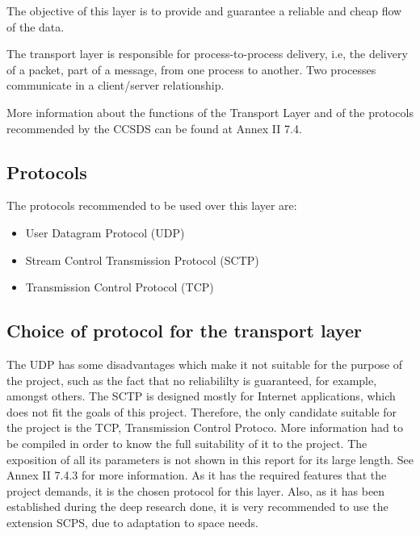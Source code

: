 %
%
%
%
%



The objective of this layer is to provide and guarantee a reliable and cheap flow of the data. 

The transport layer is responsible for process-to-process delivery, i.e, the delivery of a packet, part of a message, from one process to another. Two processes communicate in a client/server relationship. 

More information about the functions of the Transport Layer and of the protocols recommended by the CCSDS can be found at Annex II 7.4.
\subsection{Protocols}
The protocols recommended to be used over this layer are:
\begin{itemize}
\item User Datagram Protocol (UDP)
\item Stream Control Transmission Protocol (SCTP)
\item Transmission Control Protocol (TCP)
\end{itemize}
\subsection{Choice of protocol for the transport layer}
The UDP has some disadvantages which make it not suitable for the purpose of the project, such as the fact that no reliabililty is guaranteed, for example, amongst others. The SCTP is designed mostly for Internet applications, which does not fit the goals of this project. Therefore, the only candidate suitable for the project is the TCP, Transmission Control Protoco. More information had to be compiled in order to know the full suitability of it to the project. The exposition of all its parameters is not shown in this report for its large length. See Annex II 7.4.3 for more information.  As it has the required features that the project demands, it is the chosen protocol for this layer. Also, as it has been established during the deep research done, it is very recommended to use the extension SCPS, due to adaptation to space needs.  

%

